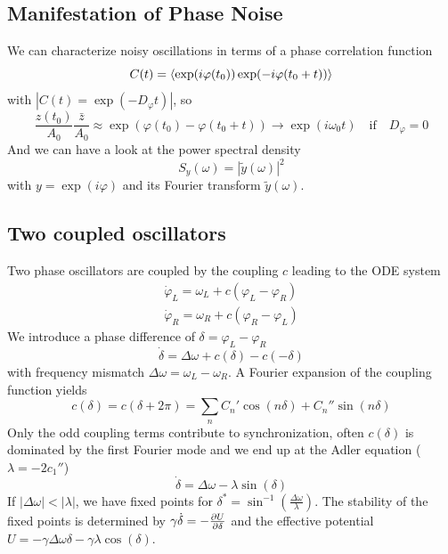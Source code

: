 \documentclass{/home/ben/Templates/notebook}
\begin{document}
	\subsection*{Manifestation of Phase Noise}
	
	We can characterize noisy oscillations in terms of a phase correlation function
	\begin{equation}
	C(t) = \expval{\exp(i \varphi(t_0)) \exp(-i \varphi(t_0 + t))}
	\end{equation}
	with $|C(t) = \exp(-D_{\varphi} t)|$, so
	\begin{equation*}
		\frac{z(t_0)}{A_0} \frac{\bar{z}}{A_0} \approx \exp(\varphi(t_0)-\varphi(t_0+t)) \to \exp(i \omega_0 t) \quad \mathrm{if} \quad D_{\varphi} = 0
	\end{equation*}
	And we can have a look at the power spectral density 
	\begin{equation}
	S_y(\omega) = |\tilde{y}(\omega)|^2
	\end{equation}
	with $y = \exp(i \varphi)$ and its Fourier transform $\tilde{y}(\omega)$. 
	
	\subsection*{Two coupled oscillators}
	
	Two phase oscillators are coupled by the coupling $c$ leading to the ODE system
	\begin{equation}
	\begin{gathered}
	\dot{\varphi}_L = \omega_L + c(\varphi_L - \varphi_R) \\
	\dot{\varphi}_R = \omega_R + c(\varphi_R - \varphi_L)
	\end{gathered}
	\end{equation}
	We introduce a phase difference of $\delta = \varphi_L - \varphi_R$
	\begin{equation}
	\dot{\delta} = \Delta \omega + c(\delta) - c(-\delta)
	\end{equation}
	with frequency mismatch $\Delta \omega = \omega_L - \omega_R$. A Fourier expansion of the coupling function yields 
	\begin{equation}
	c(\delta) = c(\delta + 2 \pi) = \sum_n{C_n' \cos(n \delta) + C_n'' \sin(n \delta)}
	\end{equation}
	Only the odd coupling terms contribute to synchronization, often $c(\delta)$ is dominated by the first Fourier mode and we end up at the Adler equation ($\lambda = - 2 c_1''$)
	\begin{equation}
	\dot{\delta} = \Delta \omega - \lambda \sin(\delta)
	\end{equation}
	If $|\Delta \omega| < |\lambda|$, we have fixed points for $\delta^* = \sin^{-1} \left( \frac{\Delta \omega}{\lambda} \right)$. The stability of the fixed points is determined by $\gamma \dot{\delta} = - \pdv{U}{\delta}$ and the effective potential $U = -\gamma \Delta \omega \delta - \gamma \lambda \cos(\delta)$. 
	
\end{document}
